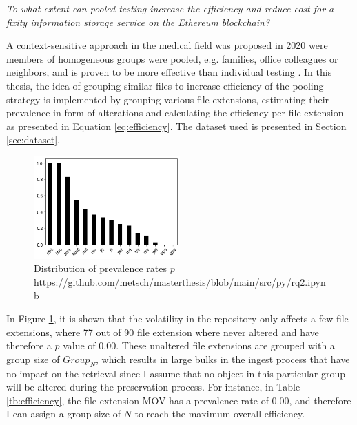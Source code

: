 \textit{To what extent can pooled testing increase the efficiency and reduce cost for a fixity information storage service on the Ethereum blockchain?}

A context-sensitive approach in the medical field was proposed in 2020 were members of homogeneous groups were pooled, e.g. families, office colleagues or neighbors, and is proven to be more effective than individual testing \cite[4]{deckert2020simulation}. In this thesis, the idea of grouping similar files to increase efficiency of the pooling strategy is implemented by grouping various file extensions, estimating their prevalence in form of alterations and calculating the efficiency per file extension as presented in Equation \ref{eq:efficiency}. The dataset used is presented in Section \ref{sec:dataset}.
\begin{figure}[h]%
    \centering
    \caption{Distribution of prevalence rates $p$ \url{https://github.com/metsch/masterthesis/blob/main/src/py/rq2.ipynb}}\label{fig:p-distribution}
    \includegraphics[width=0.5\textwidth]{graphics/p-distribution.png}
\end{figure}
In Figure \ref{fig:p-distribution}, it is shown that the volatility in the repository only affects a few file extensions, where 77 out of 90 file extension where never altered and have therefore a $p$ value of 0.00. These unaltered file extensions are grouped with a group size of $Group_N$, which results in large bulks in the ingest process that have no impact on the retrieval since I assume that no object in this particular group will be altered during the preservation process. For instance, in Table \ref{tb:efficiency}, the file extension MOV has a prevalence rate of $0.00$, and therefore I can assign a group size of $N$ to reach the maximum overall efficiency.
